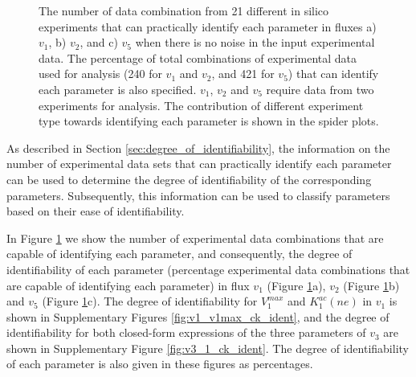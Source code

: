 \documentclass[10pt]{article}
\begin{document}
	\begin{figure}[!tbhp]
		\caption{The number of data combination from 21 different in silico experiments that can practically identify each parameter in fluxes a) $v_1$, b) $v_2$, and c) $v_5$ when there is no noise in the input experimental data. The percentage of total combinations of experimental data used for analysis (240 for $v_1$ and $v_2$, and 421 for $v_5$) that can identify each parameter is also specified. $v_1$, $v_2$ and $v_5$ require data from two experiments for analysis. The contribution of different experiment type towards identifying each parameter is shown in the spider plots.}\label{fig:ident}
	\end{figure}

	As described in Section \ref{sec:degree_of_identifiability}, the information on the number of experimental data sets that can practically identify each parameter can be used to determine the degree of identifiability of the corresponding parameters. Subsequently, this information can be used to classify parameters based on their ease of identifiability. 
		
	In Figure \ref{fig:ident} we show the number of experimental data combinations that are capable of identifying each parameter, and consequently, the degree of identifiability of each parameter (percentage experimental data combinations that are capable of identifying each parameter) in flux $v_1$ (Figure \ref{fig:ident}a), $v_2$ (Figure \ref{fig:ident}b) and $v_5$ (Figure \ref{fig:ident}c). The degree of identifiability for $V_1^{max}$ and $K_1^{ac}(ne)$ in $v_1$ is shown in Supplementary Figures \ref{fig:v1_v1max_ck_ident}, and the degree of identifiability for both closed-form expressions of the three parameters of $v_3$ are shown in Supplementary Figure \ref{fig:v3_1_ck_ident}. The degree of identifiability of each parameter is also given in these figures as percentages. 
	
\end{document}
